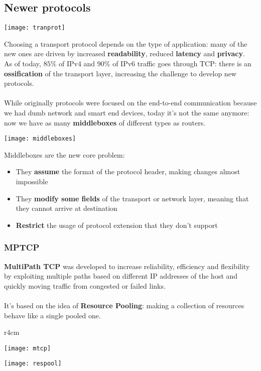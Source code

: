 \subsection{Newer protocols}
\begin{center}
	\texttt{[image: tranprot]}
\end{center}
Choosing a transport protocol depends on the type of application: many of the new ones are driven by increased \textbf{readability}, reduced \textbf{latency} and \textbf{privacy}.\\
As of today, $85\%$ of IPv4 and $90\%$ of IPv6 traffic goes through TCP: there is an \textbf{ossification} of the transport layer, increasing the challenge to develop new protocols.\\\\
While originally protocols were focused on the end-to-end communication because we had dumb network and smart end devices, today it's not the same anymore: now we have as many \textbf{middleboxes} of different types as routers.
\begin{center}
	\texttt{[image: middleboxes]}
\end{center}
Middleboxes are the new core problem:
\begin{itemize}
	\item They \textbf{assume} the format of the protocol header, making changes almost impossible
	\item They \textbf{modify some fields} of the transport or network layer, meaning that they cannot arrive at destination
	\item \textbf{Restrict} the usage of protocol extension that they don't support
\end{itemize}

\subsubsection{MPTCP}
\textbf{MultiPath TCP} was developed to increase reliability, efficiency and flexibility by exploiting multiple paths based on different IP addresses of the host and quickly moving traffic from congested or failed links.\\\\
It's based on the idea of \textbf{Resource Pooling}: making a collection of resources behave like a single pooled one.
\begin{wrapfigure}[10]{r}{4cm}
	\vspace{2.5cm}
	\begin{center}
		\texttt{[image: mtcp]}
	\end{center}
\end{wrapfigure}
\begin{center}
	\texttt{[image: respool]}
\end{center}

